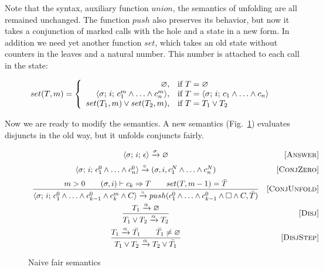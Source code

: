 
Note that the syntax, auxiliary function $union$, the semantics of unfolding are all remained unchanged. The function $push$ also preserves its behavior, but now it takes a conjunction of marked
calls with the hole and a state in a new form. In addition we need yet another function $set$, which takes an old state without counters in the leaves and a natural number. This number is
attached to each call in the state:

\[
set(T, m) =
\left\{
\begin{array}{rl}
\varnothing, & \mbox{if } T = \varnothing \\
\langle \sigma;\, i;\, c_1^m \land \ldots \land c_n^m \rangle, & \mbox{if } T = \langle \sigma;\, i;\, c_1 \land \ldots \land c_n \rangle \\
set(T_1, m) \lor set(T_2, m), & \mbox{if } T = T_1 \lor T_2
\end{array}
\right.
\]

Now we are ready to modify the semantics. A new semantics (Fig.~\ref{fair:naive-semantics}) evaluates disjuncts in the old way,
but it unfolds conjuncts fairly.

\begin{figure*} %
\[\begin{array}{cr}

      {\langle \sigma;\, i;\, \epsilon \rangle \xrightarrow{\sigma} \varnothing}  
&     \mbox{[\textsc{Answer}]} \\[2mm]
      {\langle \sigma;\, i;\, c_1^0 \land \ldots \land c_n^0 \rangle \xrightarrow{\circ} (\sigma, i, c_1^N \land \ldots \land c_n^N)}
&     \mbox{[\textsc{ConjZero}]} \\[2mm]
\dfrac{m > 0 \qquad (\sigma, i) \vdash c_k \Rightarrow T \qquad set(T, m - 1) = \bar{T}}
      {\langle \sigma;\, i;\, c_1^0 \land \ldots \land c_{k-1}^0 \land c_k^m \land C \rangle \xrightarrow{\circ} push(c_1^0 \land \ldots \land c_{k-1}^0 \land \Box \land C, \bar{T})}
&     \mbox{[\textsc{ConjUnfold}]} \\[4mm]
\dfrac{T_1 \xrightarrow{\alpha} \varnothing}
      {T_1 \lor T_2 \xrightarrow{\alpha} T_2}
&     \mbox{[\textsc{Disj}]} \\[4mm]
\dfrac{T_1 \xrightarrow{\alpha} \bar{T_1} \qquad \bar{T_1} \not= \varnothing}
      {T_1 \lor T_2 \xrightarrow{\alpha} T_2 \lor\bar{T_1}}
&     \mbox{[\textsc{DisjStep}]}
\end{array}\]
\caption{Naive fair semantics}
\label{fair:naive-semantics}
\end{figure*}

